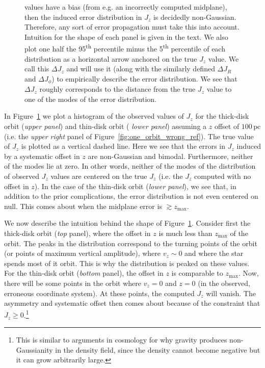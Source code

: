 \documentclass[twocolumn]{aastex62}
\newcommand{\pc}{\text{pc}}
\newcommand{\uth}{\textsuperscript{th}}
\begin{document}
\begin{figure}
{values have a bias (from e.g. an incorrectly computed midplane), then the
induced error distribution in $J_z$ is decidedly non-Gaussian. Therefore, any
sort of error propagation must take this into account. Intuition for the shape
of each panel is given in the text. We also plot one half the 95\uth{}
percentile minus the 5\uth{} percentile of each distribution as a horizontal
arrow anchored on the true $J_z$ value. We call this $\Delta J_z$ and will use
it (along with the similarly defined $\Delta J_R$ and $\Delta J_{\phi}$) to
empirically describe the error distribution. We see that $\Delta J_z$ roughly
corresponds to the distance from the true $J_z$ value to one of the modes of
the error distribution.}
\label{fig:Jz_hist}
\end{figure}

In Figure~\ref{fig:Jz_hist} we plot a histogram of the observed values of
$J_z$ for the thick-disk orbit ({\em upper panel}) and thin-disk orbit ({\em
lower panel}) assuming a $z$ offset of $100\,\pc$ (i.e. the {\em upper right} panel
of Figure~\ref{fig:one_orbit_wrong_ref}). The true value of $J_z$ is plotted
as a vertical dashed line. Here we see that the errors in $J_z$ induced by a
systematic offset in $z$ are non-Gaussian and bimodal. Furthermore, neither of
the modes lie at zero. In other words, neither of the modes of the
distribution of observed $J_z$ values are centered on the true $J_z$ (i.e. the
$J_z$ computed with no offset in $z$). In the case of the thin-disk orbit
({\em lower panel}), we see that, in addition to the prior complications, the
error distribution is not even centered on null. This comes about when the
midplane error is $\gtrsim z_{\text{max}}$.

We now describe the intuition behind the shape of Figure~\ref{fig:Jz_hist}.
Consider first the thick-disk orbit ({\em top} panel), where the
offset in $z$ is much less than $z_{\text{max}}$ of the orbit. The peaks in
the distribution correspond to the turning points of the orbit (or points of
maximum vertical amplitude), where $v_z \sim 0$ and where the star spends
most of it orbit. This is why the distribution is peaked on these values. For
the thin-disk orbit ({\em bottom} panel), the offset in $z$ is comparable to
$z_{\text{max}}$. Now, there will be some points in the orbit where $v_z = 0$
and $z=0$ (in the observed, erroneous coordinate system). At these points, the
computed $J_z$ will vanish. The asymmetry and systematic offset then comes
about because of the constraint that $J_z \geq 0$.\footnote{This is similar to
arguments in cosmology for why gravity produces non-Gaussianity in the density
field, since the density cannot become negative but it can grow arbitrarily
large.}
\end{document}
